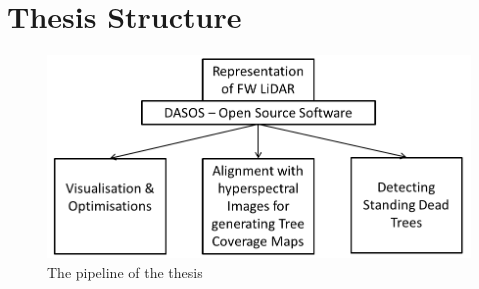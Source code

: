 \documentclass{subfiles}
\begin{document}
\section{Thesis Structure}

\begin{figure}[!htbp]
	\includegraphics[width=\textwidth]{tex/Pipeline/Pipeline.png}
	\caption{The pipeline of the thesis}
\end{figure}
\end{document}
